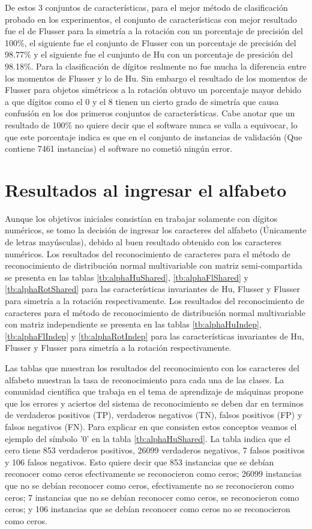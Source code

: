 \documentclass[a4paper, 11pt, oneside]{report}
\begin{document}
De estos 3 conjuntos de características, para el mejor método de clasificación probado en los experimentos, el conjunto de características con mejor resultado fue el de Flusser para la simetría a la rotación con un porcentaje de precisión del 100\%, el siguiente fue el conjunto de Flusser con un porcentaje de precisión del 98.77\% y el siguiente fue el cunjunto de Hu con un porcentaje de presición del 98.18\%. Para la clasificación de dígitos realmente no fue mucha la diferencia entre los momentos de Flusser y lo de Hu. Sin embargo el resultado de los momentos de Flusser para objetos simétricos a la rotación obtuvo un porcentaje mayor debido a que dígitos como el 0 y el 8 tienen un cierto grado de simetría que causa confusión en los dos primeros conjuntos de características. Cabe anotar que un resultado de 100\% no quiere decir que el software nunca se valla a equivocar, lo que este porcentaje indica es que en el conjunto de instancias de validación (Que contiene 7461 instancias) el software no cometió ningún error. 

\section{Resultados al ingresar el alfabeto}
Aunque los objetivos iniciales consistían en trabajar solamente con dígitos numéricos, se tomo la decisión de ingresar los caracteres del alfabeto (Únicamente de letras mayúsculas), debido al buen resultado obtenido con los caracteres numéricos. Los resultados del reconocimiento de caracteres para el método de reconocimiento de distribución normal multivariable con matriz semi-compartida se presenta en las tablas \ref{tb:alphaHuShared}, \ref{tb:alphaFlShared} y \ref{tb:alphaRotShared} para las características invariantes de Hu, Flusser y Flusser para simetría a la rotación respectivamente. Los resultados del reconocimiento de caracteres para el método de reconocimiento de distribución normal multivariable con matriz independiente se presenta en las tablas \ref{tb:alphaHuIndep}, \ref{tb:alphaFlIndep} y \ref{tb:alphaRotIndep} para las características invariantes de Hu, Flusser y Flusser para simetría a la rotación respectivamente.

Las tablas que muestran los resultados del reconocimiento con los caracteres del alfabeto muestran la tasa de reconocimiento para cada una de las clases. La comunidad científica que trabaja en el tema de aprendizaje de máquinas propone que los errores y aciertos del sistema de reconocimiento se deben dar en terminos de verdaderos positivos (TP), verdaderos negativos (TN), falsos positivos (FP) y falsos negativos (FN). Para explicar en que consisten estos conceptos veamos el ejemplo del símbolo '0' en la tabla \ref{tb:alphaHuShared}. La tabla indica que el cero tiene 853 verdaderos positivos, 26099 verdaderos negativos, 7 falsos positivos y 106 falsos negativos. Esto quiere decir que 853 instancias que se debían reconocer como ceros efectivamente se reconocieron como ceros; 26099 instancias que no se debían reconocer como ceros, efectivamente no se reconocieron como ceros; 7 instancias que no se debían reconocer como ceros, se reconocieron como ceros; y 106 instancias que se debían reconocer como ceros no se reconocieron como ceros.
\end{document}
